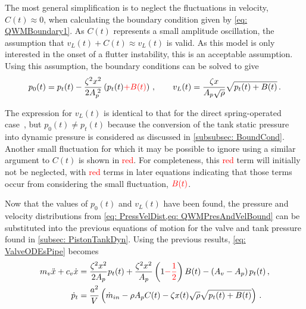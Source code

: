 The most general simplification is to neglect the fluctuations in velocity, $C(t) \approx 0$, when calculating the boundary condition given by \cref{eq: QWMBoundary1}. As $C(t)$ represents a small amplitude oscillation, the assumption that $v_L(t) + C(t) \approx v_L(t)$ is valid.
As this model is only interested in the onset of a flutter instability, this is an acceptable assumption. Using this assumption, the boundary conditions can be solved to give
~
\begin{equation} \label{eq: QWMPresAndVelBound}
    p_0(t) = p_t(t) - \frac{\zeta^2 x^2}{2 A_p\power{2}} \left( p_t(t) \textcolor{Red}{+ B(t)} \right)
    \, , \qquad
    v_L(t) = \frac{\zeta x}{A_p \sqrt{\rho}} \sqrt{p_t(t) + B(t)} \, .
\end{equation}

The expression for $v_L(t)$ is identical to that for the direct spring-operated case~\cite{Hos2015ModelPipe}, but $p_0(t) \neq p_t(t)$ because the conversion of the tank static pressure into dynamic pressure is considered as discussed in \cref{subsubsec: BoundCond}. Another small fluctuation for which it may be possible to ignore using a similar argument to $C(t)$ is shown in \textcolor{Red}{red}. For completeness, this \textcolor{Red}{red} term will initially not be neglected, with \textcolor{Red}{red} terms in later equations indicating that those terms occur from considering the small fluctuation, $\textcolor{Red}{B(t)}$.
%

Now that the values of $p_0(t)$ and $v_L(t)$ have been found, the pressure and velocity distributions from \cref{eq: PressVelDist,eq: QWMPresAndVelBound} can be substituted into the previous equations of motion for the valve and tank pressure found in \cref{subsec: PistonTankDyn}. Using the previous results, \cref{eq: ValveODEsPipe} becomes
~
\begin{equation*}
\begin{split}
    m_v \ddot{x} + c_v \dot{x} &= \frac{\zeta^2 x^2}{2 A_p} p_t(t) + \frac{\zeta^2 x^2}{A_p} \left( 1 \textcolor{Red}{- \frac{1}{2}} \right) B(t) - \left( A_v - A_p \right) p_t(t)
    \, , \\
    \dot{p}_t &= \frac{a^2}{V} \left( \dot{m}_{in} - \rho A_p C(t) - \zeta x(t) \sqrt{\rho} \sqrt{p_t(t) + B(t)} \right) \, .
\end{split}
\end{equation*}

